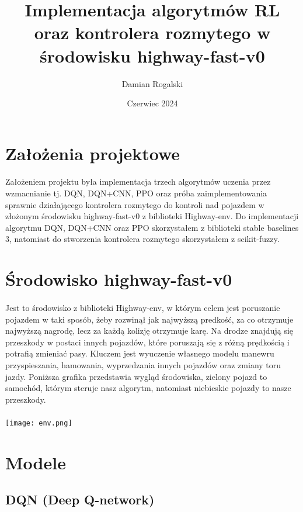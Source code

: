 \documentclass{article}
\title{Implementacja algorytmów RL oraz kontrolera rozmytego w środowisku highway-fast-v0}
\author{Damian Rogalski}
\date{Czerwiec 2024}
\begin{document}
\maketitle

\section{Założenia projektowe}
\paragraph{}
Założeniem projektu była implementacja trzech algorytmów uczenia przez wzmacnianie tj. DQN, DQN+CNN, PPO oraz próba zaimplementowania sprawnie działającego kontrolera rozmytego do kontroli nad pojazdem w złożonym środowisku highway-fast-v0 z biblioteki Highway-env. Do implementacji algorytmu DQN, DQN+CNN oraz PPO skorzystałem z biblioteki stable baselines 3, natomiast do stworzenia kontrolera rozmytego skorzystałem z scikit-fuzzy.

\section{Środowisko highway-fast-v0}
\paragraph{}
Jest to środowisko z biblioteki Highway-env, w którym celem jest poruszanie pojazdem w taki sposób, żeby rozwinął jak najwyższą predkość, za co otrzymuje najwyższą nagrodę, lecz za każdą kolizję otrzymuje karę. Na drodze znajdują się przeszkody w postaci innych pojazdów, które poruszają się z różną prędkością i potrafią zmieniać pasy. Kluczem jest wyuczenie własnego modelu manewru przyspieszania, hamowania, wyprzedzania innych pojazdów oraz zmiany toru jazdy.
Poniższa grafika przedstawia wygląd środowiska, zielony pojazd to samochód, którym steruje nasz algorytm, natomiast niebieskie pojazdy to nasze przeszkody.

\paragraph{}
\texttt{[image: env.png]}

\newpage


\section{Modele}
\subsection{DQN (Deep Q-network)}
\end{document}
